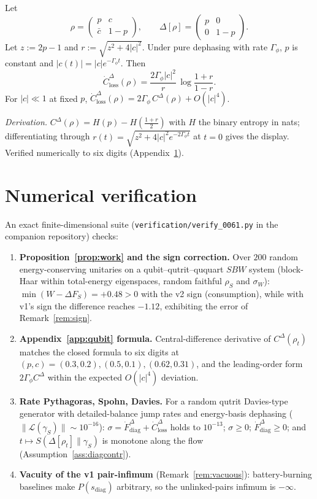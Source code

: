 \documentclass[11pt,a4paper]{article}
\theoremstyle{plain}
\theoremstyle{definition}
\theoremstyle{remark}
\newcommand{\Closs}{\dot{C}^{\Delta}_{\mathrm{loss}}}
\newcommand{\Fdiag}{\dot{F}^{\Delta}_{\mathrm{diag}}}
\begin{document}
Let
\begin{equation}
\rho = \begin{pmatrix} p & c \\ \bar{c} & 1-p \end{pmatrix}, \qquad
\Delta[\rho] = \begin{pmatrix} p & 0 \\ 0 & 1-p \end{pmatrix}.
\end{equation}
Let $z := 2p - 1$ and $r := \sqrt{z^2 + 4|c|^2}$. Under pure dephasing with
rate $\Gamma_\phi$, $p$ is constant and $|c(t)| = |c|e^{-\Gamma_\phi t}$. Then
\begin{equation}
\Closs(\rho) = \frac{2\Gamma_\phi |c|^2}{r}\,\log\frac{1+r}{1-r}.
\end{equation}
For $|c| \ll 1$ at fixed $p$,
$\Closs(\rho) = 2\Gamma_\phi\, C^\Delta(\rho) + O(|c|^4)$.

\emph{Derivation.} $C^\Delta(\rho) = H(p) - H\!\left(\tfrac{1+r}{2}\right)$
with $H$ the binary entropy in nats; differentiating through
$r(t) = \sqrt{z^2 + 4|c|^2 e^{-2\Gamma_\phi t}}$ at $t = 0$ gives the display.
Verified numerically to six digits (Appendix~\ref{app:numerics}).

\section{Numerical verification}\label{app:numerics}

An exact finite-dimensional suite (\texttt{verification/verify\_0061.py} in the
companion repository) checks:

\begin{enumerate}
\item \textbf{Proposition~\ref{prop:work} and the sign correction.} Over $200$
random energy-conserving unitaries on a qubit--qutrit--ququart $SBW$ system
(block-Haar within total-energy eigenspaces, random faithful $\rho_S$ and
$\sigma_W$): $\min(W - \Delta F_S) = +0.48 > 0$ with the v2 sign
(consumption), while with v1's sign the difference reaches $-1.12$, exhibiting
the error of Remark~\ref{rem:sign}.
\item \textbf{Appendix~\ref{app:qubit} formula.} Central-difference derivative
of $C^\Delta(\rho_t)$ matches the closed formula to six digits at
$(p, c) = (0.3, 0.2), (0.5, 0.1), (0.62, 0.31)$, and the leading-order form
$2\Gamma_\phi C^\Delta$ within the expected $O(|c|^4)$ deviation.
\item \textbf{Rate Pythagoras, Spohn, Davies.} For a random qutrit Davies-type
generator with detailed-balance jump rates and energy-basis dephasing
($\|\mathcal{L}(\gamma_S)\| \sim 10^{-16}$):
$\sigma = \Fdiag + \Closs$ holds to $10^{-13}$; $\sigma \ge 0$;
$\Fdiag \ge 0$; and $t \mapsto S(\Delta[\rho_t]\|\gamma_S)$ is monotone along
the flow (Assumption~\ref{ass:diagcontr}).
\item \textbf{Vacuity of the v1 pair-infimum} (Remark~\ref{rem:vacuous}):
battery-burning baselines make $P(s_{\mathrm{diag}})$ arbitrary, so the
unlinked-pairs infimum is $-\infty$.
\end{enumerate}
\end{document}
